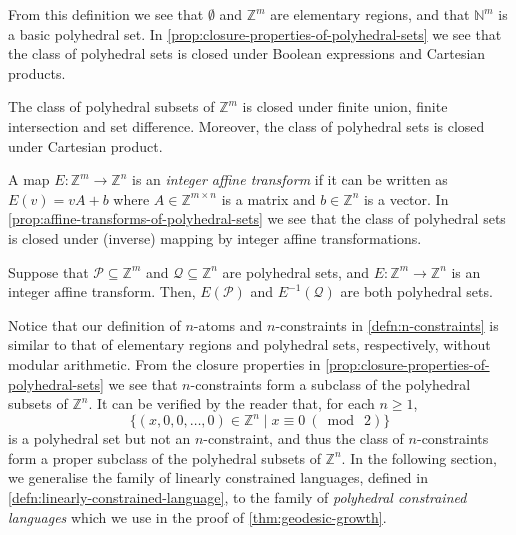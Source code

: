From this definition we see that $\emptyset$ and $\mathbb{Z}^m$ are elementary regions, and that $\mathbb{N}^m$ is a basic polyhedral set.
In \cref{prop:closure-properties-of-polyhedral-sets} we see that the class of polyhedral sets is closed under Boolean expressions and Cartesian products.

\begin{proposition}\label{prop:closure-properties-of-polyhedral-sets}
	The class of polyhedral subsets of $\mathbb{Z}^m$ is{\tiny } closed under finite union, finite intersection and set difference.
	Moreover, the class of polyhedral sets is closed under Cartesian product.
\end{proposition}

A map $E \colon \mathbb{Z}^m \to \mathbb{Z}^n$ is an \emph{integer affine transform} if it can be written as $E(v) = vA + b$ where $A \in \mathbb{Z}^{m \times n}$ is a matrix and $b \in \mathbb{Z}^n$ is a vector.
In \cref{prop:affine-transforms-of-polyhedral-sets} we see that the class of polyhedral sets is closed under (inverse) mapping by integer affine transformations.

\begin{proposition}\label{prop:affine-transforms-of-polyhedral-sets}
	Suppose that $\mathcal{P} \subseteq \mathbb{Z}^m$ and $\mathcal{Q} \subseteq \mathbb{Z}^n$ are polyhedral sets, and $E\colon\mathbb{Z}^m\to\mathbb{Z}^n$ is an integer affine transform.
	Then, $E(\mathcal{P})$ and $E^{-1}(\mathcal{Q})$ are both polyhedral sets.
\end{proposition}

Notice that our definition of $n$-atoms and $n$-constraints in \cref{defn:n-constraints} is similar to that of elementary regions and polyhedral sets, respectively, without modular arithmetic.
From the closure properties in \cref{prop:closure-properties-of-polyhedral-sets} we see that $n$-constraints form a subclass of the polyhedral subsets of $\mathbb{Z}^n$.
It can be verified by the reader that, for each $n \geqslant 1$,
\[
	\{
		(x,0,0,\ldots,0) \in \mathbb{Z}^n
	\mid
		x \equiv 0\ (\bmod\ 2)
	\}
\]
is a polyhedral set but not an $n$-constraint, and thus the class of $n$-constraints form a proper subclass of the polyhedral subsets of $\mathbb{Z}^n$.
In the following section, we generalise the family of linearly constrained languages, defined in \cref{defn:linearly-constrained-language}, to the family of \emph{polyhedral constrained languages} which we use in the proof of \cref{thm:geodesic-growth}.

